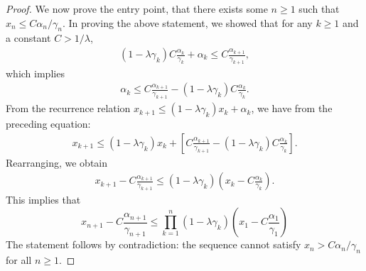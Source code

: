 \documentclass[10pt,a4paper]{amsart}
\begin{document}
\begin{proof}
    We now prove the entry point, that there exists some $n \geq 1$ such that $x_n \leq C \alpha_n/\gamma_n$. 
    In proving the above statement, we showed that for any $k \geq 1$ and a constant $C > 1/\lambda$,
    \begin{align*}
        (1 - \lambda \gamma_k) C \frac{\alpha_k}{\gamma_k} + \alpha_k \leq C \frac{\alpha_{k+1}}{\gamma_{k+1}} ,
    \end{align*}
    which implies
    \begin{align*}
        \alpha_k \leq C \frac{\alpha_{k+1}}{\gamma_{k+1}} - (1 - \lambda \gamma_k) C \frac{\alpha_k}{\gamma_k} . 
    \end{align*}
    From the recurrence relation $x_{k+1} \leq (1 - \lambda \gamma_k) x_k + \alpha_k$, we have from the preceding equation:
    \begin{align*}
        x_{k+1} \leq (1 - \lambda \gamma_k) x_k + \left[ C \frac{\alpha_{k+1}}{\gamma_{k+1}} - (1 - \lambda \gamma_k) C \frac{\alpha_k}{\gamma_k}\right] . 
    \end{align*}
    Rearranging, we obtain
    \begin{align*}
        x_{k+1} - C \frac{\alpha_{k+1}}{\gamma_{k+1}}
        \leq (1 - \lambda \gamma_k) \left( x_k - C \frac{\alpha_k}{\gamma_k}\right) . 
    \end{align*}
    This implies that
    \begin{equation}
        x_{n+1} - C \frac{\alpha_{n+1}}{\gamma_{n+1}} \leq \prod_{k=1}^n (1 - \lambda \gamma_k) \left(x_1 - C \frac{\alpha_1}{\gamma_1}\right) 
    \end{equation}
    The statement follows by contradiction: the sequence cannot satisfy $x_{n} > C \alpha_n/\gamma_n$ for all $n \geq 1$. 
    
    
\end{proof}
\end{document}
